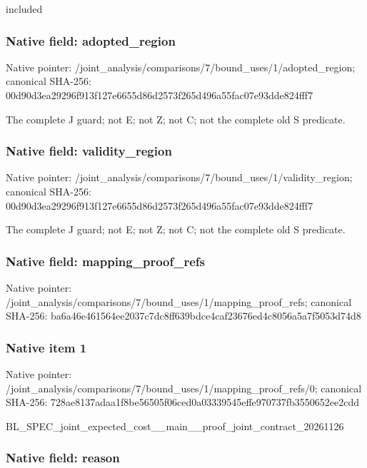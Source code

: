 \documentclass[10pt,a4paper]{article}
\begin{document}
included


\subsubsection{Native field: adopted\_region}


Native pointer: /joint\_analysis/comparis\allowbreak{}ons/7/bound\_uses/1/adopt\allowbreak{}ed\_region; canonical SHA-256: 00d90d3ea29296f913f127e6\allowbreak{}655d86d2573f265d496a55fa\allowbreak{}c07e93dde824fff7


The complete J guard; not E; not Z; not C; not the complete old S predicate.


\subsubsection{Native field: validity\_region}


Native pointer: /joint\_analysis/comparis\allowbreak{}ons/7/bound\_uses/1/valid\allowbreak{}ity\_region; canonical SHA-256: 00d90d3ea29296f913f127e6\allowbreak{}655d86d2573f265d496a55fa\allowbreak{}c07e93dde824fff7


The complete J guard; not E; not Z; not C; not the complete old S predicate.


\subsubsection{Native field: mapping\_proof\_refs}


Native pointer: /joint\_analysis/comparis\allowbreak{}ons/7/bound\_uses/1/mappi\allowbreak{}ng\_proof\_refs; canonical SHA-256: ba6a46e461564ee2037c7dc8\allowbreak{}ff639bdce4caf23676ed4c80\allowbreak{}56a5a7f5053d74d8



\subsubsection{Native item 1}


Native pointer: /joint\_analysis/comparis\allowbreak{}ons/7/bound\_uses/1/mappi\allowbreak{}ng\_proof\_refs/0; canonical SHA-256: 728ae8137adaa1f8be56505f\allowbreak{}06ced0a03339545effe97073\allowbreak{}7fb3550652ee2cdd


BL\_SPEC\_joint\_expected\_c\allowbreak{}ost\_\_main\_\_proof\_joint\_c\allowbreak{}ontract\_20261126


\subsubsection{Native field: reason}
\end{document}

